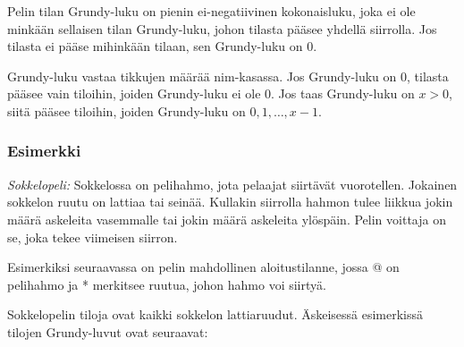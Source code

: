 Pelin tilan Grundy-luku on pienin ei-negatiivinen kokonaisluku,
joka ei ole minkään sellaisen tilan Grundy-luku,
johon tilasta pääsee yhdellä siirrolla.
Jos tilasta ei pääse mihinkään tilaan,
sen Grundy-luku on 0.

Grundy-luku vastaa tikkujen määrää nim-kasassa.
Jos Grundy-luku on 0, tilasta pääsee vain tiloihin,
joiden Grundy-luku ei ole 0.
Jos taas Grundy-luku on $x>0$, siitä pääsee tiloihin,
joiden Grundy-luku on $0,1,\ldots,x-1$.

\subsubsection*{Esimerkki}

\textit{Sokkelopeli:} Sokkelossa on pelihahmo,
jota pelaajat siirtävät vuorotellen.
Jokainen sokkelon ruutu on lattiaa tai seinää.
Kullakin siirrolla hahmon tulee liikkua jokin
määrä askeleita vasemmalle tai jokin
määrä askeleita ylöspäin.
Pelin voittaja on se, joka tekee viimeisen siirron.

Esimerkiksi seuraavassa on pelin mahdollinen aloitustilanne,
jossa @ on pelihahmo ja * merkitsee ruutua, johon hahmo voi siirtyä.

\begin{center}
\end{center}

Sokkelopelin tiloja ovat kaikki sokkelon
lattiaruudut. Äskeisessä esimerkissä
tilojen Grundy-luvut ovat seuraavat:

\begin{center}
\end{center}

